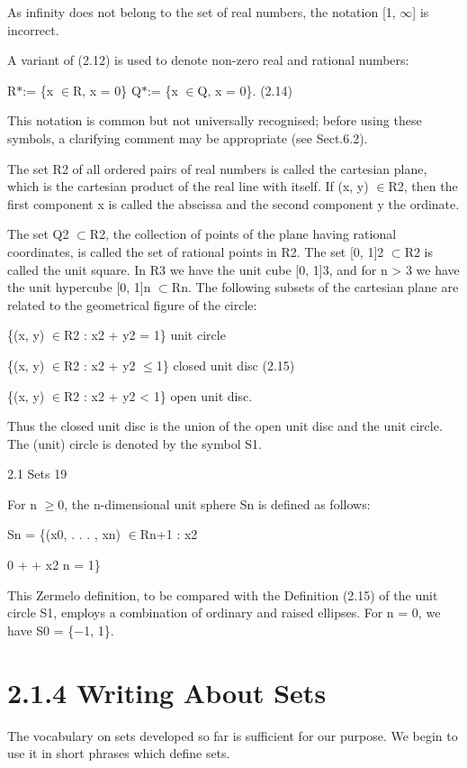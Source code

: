 \documentclass[11pt]{article}
\theoremstyle{plain}
\theoremstyle{definition}
\begin{document}
As infinity does not belong to the set of real numbers, the notation [1, $\infty$] is incorrect.

A variant of (2.12) is used to denote non-zero real and rational numbers:

R$*$:= \{x $\in$R, x = 0\} Q$*$:= \{x $\in$Q, x = 0\}. (2.14)

This notation is common but not universally recognised; before using these symbols, a clarifying comment may be appropriate (see Sect.6.2).

The set R2 of all ordered pairs of real numbers is called the cartesian plane, which is the cartesian product of the real line with itself. If (x, y) $\in$R2, then the first component x is called the abscissa and the second component y the ordinate.

The set Q2 $\subset$R2, the collection of points of the plane having rational coordinates, is called the set of rational points in R2. The set [0, 1]2 $\subset$R2 is called the unit square. In R3 we have the unit cube [0, 1]3, and for n > 3 we have the unit hypercube [0, 1]n $\subset$Rn. The following subsets of the cartesian plane are related to the geometrical figure of the circle:

\{(x, y) $\in$R2 : x2 + y2 = 1\} unit circle

\{(x, y) $\in$R2 : x2 + y2 $\leq$1\} closed unit disc (2.15)

\{(x, y) $\in$R2 : x2 + y2 < 1\} open unit disc.

Thus the closed unit disc is the union of the open unit disc and the unit circle. The (unit) circle is denoted by the symbol S1.

2.1 Sets 19

For n $\geq$0, the n-dimensional unit sphere Sn is defined as follows:

Sn = \{(x0, . . . , xn) $\in$Rn+1 : x2

0 + \textperiodcentered{} \textperiodcentered{} \textperiodcentered{} + x2 n = 1\}

This Zermelo definition, to be compared with the Definition (2.15) of the unit circle S1, employs a combination of ordinary and raised ellipses. For n = 0, we have S0 = \{$-$1, 1\}.

\section{2.1.4 Writing About Sets}

The vocabulary on sets developed so far is sufficient for our purpose. We begin to use it in short phrases which define sets.
\end{document}
